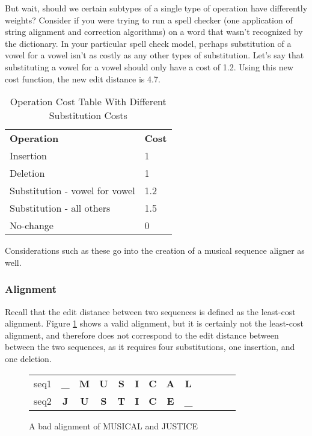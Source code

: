 But wait, should we certain subtypes of a single type of operation have differently weights? Consider if you were trying to run a spell checker (one application of string alignment and correction algorithms) on a word that wasn't recognized by the dictionary. In your particular spell check model, perhaps substitution of a vowel for a vowel isn't as costly as any other types of substitution. Let's say that substituting a vowel for a vowel should only have a cost of 1.2. Using this new cost function, the new edit distance is 4.7.
\begin{table}[!h]
\centering
\begin{tabular}{ll}
\textbf{Operation}             & \textbf{Cost} \\
Insertion                      & 1             \\
Deletion                       & 1             \\
Substitution - vowel for vowel & 1.2           \\
Substitution - all others      & 1.5           \\
No-change                      & 0                
\end{tabular}
\caption{Operation Cost Table With Different Substitution Costs}
\label{my-label3}
\end{table}

Considerations such as these go into the creation of a musical sequence aligner as well. 
\subsubsection{Alignment}

Recall that the edit distance between two sequences is defined as the least-cost alignment. Figure \ref{badalign} shows a valid alignment, but it is certainly not the least-cost alignment, and therefore does not correspond to the edit distance between between the two sequences, as it requires four substitutions, one insertion, and one deletion.

\begin{figure}[!h]
\centering
\begin{tabular}{lcccccccccccc}
seq1 & {\color[HTML]{009901} \textbf{\_}} & {\color[HTML]{6200C9} \textbf{M}} & {\color[HTML]{6200C9} \textbf{U}} & {\color[HTML]{6200C9} \textbf{S}} & \textbf{I} & \textbf{C} & {\color[HTML]{6200C9} \textbf{A}} & {\color[HTML]{9A0000} \textbf{L}}  & \textbf{} & \textbf{} & \textbf{} &  \\
seq2 & {\color[HTML]{009901} \textbf{J}}  & {\color[HTML]{6200C9} \textbf{U}} & {\color[HTML]{6200C9} \textbf{S}} & {\color[HTML]{6200C9} \textbf{T}} & \textbf{I} & \textbf{C} & {\color[HTML]{6200C9} \textbf{E}} & {\color[HTML]{9A0000} \textbf{\_}} & \textbf{} & \textbf{} & \textbf{} & 
\end{tabular}
\caption{A bad alignment of MUSICAL and JUSTICE}
\label{badalign}
\end{figure}

